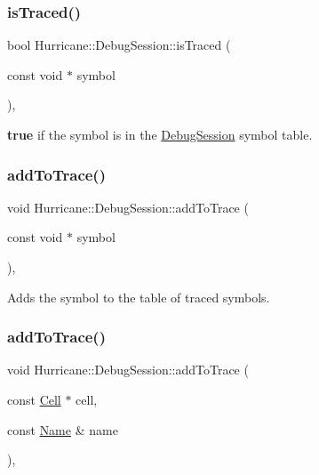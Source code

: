 \subsubsection{\texorpdfstring{is\+Traced()}{isTraced()}}
{\footnotesize\ttfamily bool Hurricane\+::\+Debug\+Session\+::is\+Traced (\begin{DoxyParamCaption}\item[{const void $\ast$}]{symbol }\end{DoxyParamCaption})\hspace{0.3cm}{\ttfamily [inline]}, {\ttfamily [static]}}

{\bfseries true} if the {\ttfamily symbol} is in the \mbox{\hyperlink{classHurricane_1_1DebugSession}{Debug\+Session}} symbol table. \mbox{\label{classHurricane_1_1DebugSession_aa7ee4a8517bc4a99c37f0a9ae26b9620}} 
\subsubsection{\texorpdfstring{add\+To\+Trace()}{addToTrace()}\hspace{0.1cm}{\footnotesize\ttfamily [1/2]}}
{\footnotesize\ttfamily void Hurricane\+::\+Debug\+Session\+::add\+To\+Trace (\begin{DoxyParamCaption}\item[{const void $\ast$}]{symbol }\end{DoxyParamCaption})\hspace{0.3cm}{\ttfamily [inline]}, {\ttfamily [static]}}

Adds the {\ttfamily symbol} to the table of traced symbols. \mbox{\label{classHurricane_1_1DebugSession_ab7f9fbef88775e509ae7b127e524b100}} 
\subsubsection{\texorpdfstring{add\+To\+Trace()}{addToTrace()}\hspace{0.1cm}{\footnotesize\ttfamily [2/2]}}
{\footnotesize\ttfamily void Hurricane\+::\+Debug\+Session\+::add\+To\+Trace (\begin{DoxyParamCaption}\item[{const \mbox{\hyperlink{classHurricane_1_1Cell}{Cell}} $\ast$}]{cell,  }\item[{const \mbox{\hyperlink{classHurricane_1_1Name}{Name}} \&}]{name }\end{DoxyParamCaption})\hspace{0.3cm}{\ttfamily [inline]}, {\ttfamily [static]}}


